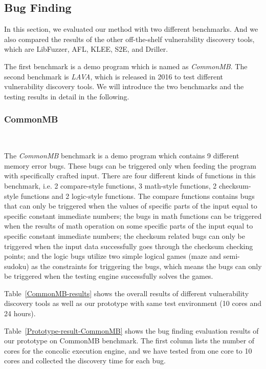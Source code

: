 \subsection{Bug Finding}
In this section, we evaluated our method with two different benchmarks. And we also compared the results of the other off-the-shelf vulnerability discovery tools, which are LibFuzzer, AFL, KLEE, S2E, and Driller.

The first benchmark is a demo program which is named as \emph{CommonMB}. The second benchmark is \emph{LAVA}, which is released in 2016 to test different vulnerability discovery tools. We will introduce the two benchmarks and the testing results in detail in the following.


\subsubsection{CommonMB}~\par
\vskip0.5mm
\noindent The \emph{CommonMB} benchmark is a demo program which contains 9 different memory error bugs. These bugs can be triggered only when feeding the program with specifically crafted input. There are four different kinds of functions in this benchmark, i.e. 2 compare-style functions, 3 math-style functions, 2 checksum-style functions and 2 logic-style functions. The compare functions contains bugs that can only be triggered when the values of specific parts of the input equal to specific constant immediate numbers; the bugs in math functions can be triggered when the results of math operation on some specific parts of the input equal to specific constant immediate numbers; the checksum related bugs can only be triggered when the input data successfully goes through the checksum checking points; and the logic bugs utilize two simple logical games (maze and semi-sudoku) as the constraints for triggering the bugs, which means the bugs can only be triggered when the testing engine successfully solves the games.

Table~\ref{CommonMB-results} shows the overall results of different vulnerability discovery tools as well as our prototype with same test environment (10 cores and 24 hours). 

Table~\ref{Prototype-result-CommonMB} shows the bug finding evaluation results of our prototype on CommonMB benchmark. The first column lists the number of cores for the concolic execution engine, and we have tested from one core to 10 cores and collected the discovery time for each bug. 

